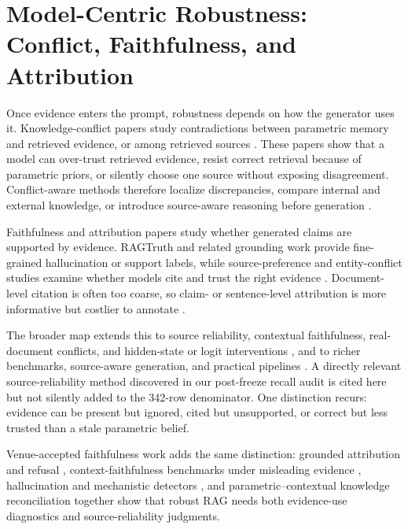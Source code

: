 \section{Model-Centric Robustness: Conflict, Faithfulness, and Attribution}

Once evidence enters the prompt, robustness depends on how the generator uses it. Knowledge-conflict papers study contradictions between parametric memory and retrieved evidence, or among retrieved sources \citep{tugOfWar2024,faithfulRAG2025,astuteRAG2025,rrag046}. These papers show that a model can over-trust retrieved evidence, resist correct retrieval because of parametric priors, or silently choose one source without exposing disagreement. Conflict-aware methods therefore localize discrepancies, compare internal and external knowledge, or introduce source-aware reasoning before generation \citep{rrag008,rrag013,rrag017,rrag024,rrag029,rrag031,rrag036,rrag038}.

Faithfulness and attribution papers study whether generated claims are supported by evidence. RAGTruth and related grounding work provide fine-grained hallucination or support labels, while source-preference and entity-conflict studies examine whether models cite and trust the right evidence \citep{ragTruth2024,rrag110,rrag112,rrag115,rrag132}. Document-level citation is often too coarse, so claim- or sentence-level attribution is more informative but costlier to annotate \citep{rrag076,rrag077,rrag082,rrag086,rrag089,rrag092,rrag100}.

The broader map extends this to source reliability, contextual faithfulness, real-document conflicts, and hidden-state or logit interventions \citep{rrag118,rrag130,rrag147,rrag150,rrag152,rrag163,rrag176,rrag187}, and to richer benchmarks, source-aware generation, and practical pipelines \citep{rrag202,rrag204,rrag207,rrag209,rrag214,rrag216,rrag220,rrag222,rrag223,rrag227}. A directly relevant source-reliability method discovered in our post-freeze recall audit \citep{sourceReliabilityRAG2025} is cited here but not silently added to the 342-row denominator. One distinction recurs: evidence can be present but ignored, cited but unsupported, or correct but less trusted than a stale parametric belief.

Venue-accepted faithfulness work adds the same distinction: grounded attribution and refusal \citep{venueAcc001}, context-faithfulness benchmarks under misleading evidence \citep{rrag040}, hallucination and mechanistic detectors \citep{venueAcc020,venueAcc026}, and parametric--contextual knowledge reconciliation \citep{venueAcc027} together show that robust RAG needs both evidence-use diagnostics and source-reliability judgments.

